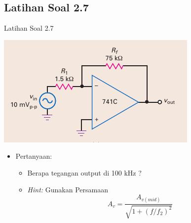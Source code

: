 \subsection{Latihan Soal 2.7}
\begin{frame}{Latihan Soal 2.7}
	\begin{multicols}{2}
		\begin{center}
			\includegraphics[width=\linewidth]{gambar/fig-16.16a}
		\end{center}
		\columnbreak
		\begin{itemize}
			\item Pertanyaan:
			\begin{itemize}
				\item Berapa tegangan output di 100 kHz ?
				\item \textit{Hint:} Gunakan Persamaan \[ A_v = \frac{A_{v(mid)}}{ \sqrt{1 + (f/f_2)^2} } \]
			\end{itemize}
		\end{itemize}
	\end{multicols}
\end{frame}

